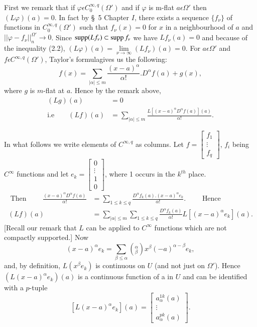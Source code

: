 First we remark that if $\varphi \epsilon C^{\infty,q}_0 (\Omega')$
and if $\varphi$ is m-flat $a \epsilon \Omega'$ then $(L \varphi)
(a) = 0$. In fact by \S\ 5 Chapter $I$, there exists a sequence
$\{f_\nu\}$ of functions in $C_0^{\infty,q} (\Omega')$ such that
$f_\nu (x) = 0$ for $x$ in a neighbourhood of $a$ and $|| \varphi-
f_\nu||_n^{\Omega'} \to 0$. Since $\operatorname{supp} (Lf_\nu) \subset \operatorname{supp} f_\nu$
we have $Lf_\nu (a) = 0$ and because of the inequality (2.2), $(L
\varphi) (a) = \lim\limits_{\nu \to \infty} (Lf_\nu) (a) =0$. For $a
\epsilon \Omega'$ and $f \epsilon C^{\infty,q} (\Omega')$,
Taylor's formula\pageoriginale gives us the following: 
$$
f (x) = \sum_{|\alpha| \le m} \frac{(x-a)^\alpha} {\alpha !}. D^\alpha f (a) + g (x),
$$
where $g$ is $m$-flat at $a$. Hence by the remark above,
\begin{align*}
  (Lg) (a) & = 0 \\
  \text{i.e} \qquad (Lf) (a) & =\sum_{|\alpha| \le m} \frac{L[(x-a)^\alpha
      D^\alpha f(a)] (a)} {\alpha !}. 
\end{align*}

In what follows we write elements of $C^{\infty,q}$ as columns. Let $f
=\begin{bmatrix} f_1 \\ \vdots \\ f_q\end{bmatrix}$, $f_i$ being
$C^\infty$ functions and let $e_k =  \begin{bmatrix} 0
  \\ \vdots\\ 1\\ 0\end{bmatrix}$, where 1 occurs in the $k^{th}$
  place. 
\begin{align*}
  \text{ Then } \qquad \frac{(x-a)^\alpha D^\alpha f(a)} {\alpha !} &
  = \sum_{1 \le k \le q} \frac{D^\alpha f_k (a). (x-a)^\alpha
    e_k}{\alpha !}. \qquad \text{ Hence }\\ 
  (Lf) (a) & = \sum_{|\alpha| \le m} \sum_{1 \le k \le q} \frac
  {D^\alpha f_k (a)} {\alpha !} L [(x-a)^\alpha e_k] (a). 
\end{align*}
[Recall our remark that $L$ can be applied to $C^\infty$ functions
  which are not compactly supported.] Now 
$$
(x-a)^\alpha e_k = \sum_{\beta \le \alpha} (^\alpha_\beta) x^\beta
(-a)^{\alpha-\beta} e_k, 
$$
and, by definition, $L (x^\beta e_k)$ is continuous on $U$ (and not
just on $\Omega'$). Hence $(L (x-a)^\alpha e_k) (a)$ is a continuous
function of a in $U$ and can be identified with a $p$-tuple  
$$
[L (x-a)^\alpha e_k] (a) = \begin{bmatrix} a^{1k}_{\alpha}(a)
  \\ \vdots\\ a^{pk}_\alpha (a)\end{bmatrix}. 
$$

